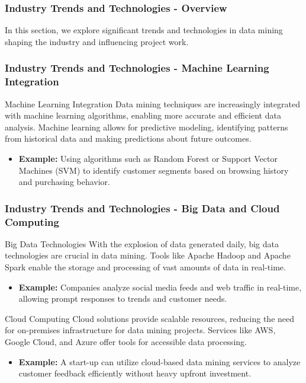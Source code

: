 \documentclass{beamer}
\begin{document}
\begin{frame}[fragile]
    \frametitle{Industry Trends and Technologies - Overview}
    In this section, we explore significant trends and technologies in data mining shaping the industry and influencing project work.
\end{frame}

\begin{frame}[fragile]
    \frametitle{Industry Trends and Technologies - Machine Learning Integration}
    \begin{block}{Machine Learning Integration}
        Data mining techniques are increasingly integrated with machine learning algorithms, enabling more accurate and efficient data analysis. 
        Machine learning allows for predictive modeling, identifying patterns from historical data and making predictions about future outcomes.
    \end{block}
    \begin{itemize}
        \item \textbf{Example:} Using algorithms such as Random Forest or Support Vector Machines (SVM) to identify customer segments based on browsing history and purchasing behavior.
    \end{itemize}
\end{frame}

\begin{frame}[fragile]
    \frametitle{Industry Trends and Technologies - Big Data and Cloud Computing}
    \begin{block}{Big Data Technologies}
        With the explosion of data generated daily, big data technologies are crucial in data mining. 
        Tools like Apache Hadoop and Apache Spark enable the storage and processing of vast amounts of data in real-time.
    \end{block}
    \begin{itemize}
        \item \textbf{Example:} Companies analyze social media feeds and web traffic in real-time, allowing prompt responses to trends and customer needs.
    \end{itemize}
    
    \begin{block}{Cloud Computing}
        Cloud solutions provide scalable resources, reducing the need for on-premises infrastructure for data mining projects. 
        Services like AWS, Google Cloud, and Azure offer tools for accessible data processing.
    \end{block}
    \begin{itemize}
        \item \textbf{Example:} A start-up can utilize cloud-based data mining services to analyze customer feedback efficiently without heavy upfront investment.
    \end{itemize}
\end{frame}
\end{document}
